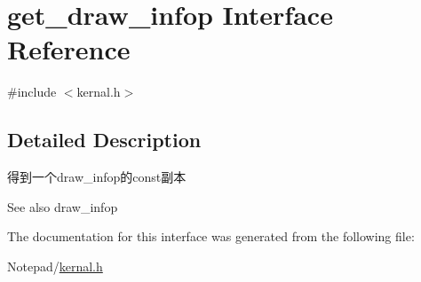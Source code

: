 \hypertarget{interfaceget__draw__infop}{}\section{get\+\_\+draw\+\_\+infop Interface Reference}
\label{interfaceget__draw__infop}


{\ttfamily \#include $<$kernal.\+h$>$}



\subsection{Detailed Description}
得到一个draw\+\_\+infop的const副本 \begin{DoxySeeAlso}{See also}
draw\+\_\+infop 
\end{DoxySeeAlso}


The documentation for this interface was generated from the following file\+:\begin{DoxyCompactItemize}
\item 
Notepad/\hyperlink{kernal_8h}{kernal.\+h}\end{DoxyCompactItemize}
